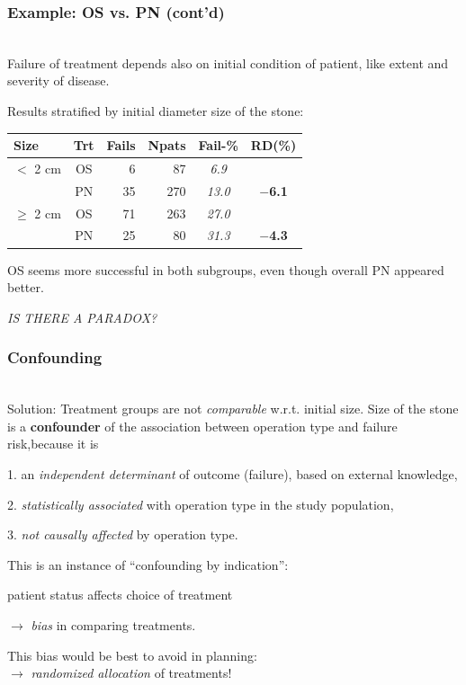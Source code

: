 \documentclass[handout,12pt]{beamer}
\begin{document}
\begin{frame}[fragile] \frametitle{Example: OS vs. PN (cont'd)}
\ \\
Failure of treatment depends also on initial condition
of patient, like extent and severity of disease.

Results stratified by initial diameter size of the stone:

\begin{center}
\begin{tabular}{lcrrcc}
\toprule
Size   &   Trt        & Fails  & Npats & Fail-\% & {\bf RD(\%)}\\
\midrule
$<$ 2 cm  &  OS                &         6        &  87        &        {\em 6.9}  & { } \\
 & PN                &        35        & 270        &        {\em 13.0} & {\bf $-$6.1} \\
\midrule
$\geq$ 2 cm  &  OS         &          71 &        263        & {\em 27.0} & { }  \\
  &  PN         &          25 &         80        & {\em 31.3} & 
  {\bf $-$4.3} \\
\bottomrule
\end{tabular}
\end{center}

OS seems more successful in both subgroups, even though overall PN appeared better.

{\it IS THERE A PARADOX?}
\end{frame} 


\begin{frame}[fragile] \frametitle{Confounding}
\ \\
Solution:
Treatment groups are not {\it comparable}
w.r.t. initial size.
Size of the stone is a {\bf confounder}
of the association between operation type
and failure risk,because it is
\bi
\item[1.] an {\it independent determinant} of outcome (failure), based on
external knowledge,
\item[2.] {\it statistically associated} with operation type in the
   study population,
\item[3.] {\it not causally affected} by operation type.
\ei

This is an instance of ``confounding by indication'':
\bi
   \item patient status
affects choice of treatment 
  \item[$\to$] {\it bias} in comparing treatments.
\ei

This bias would be best to avoid in planning: \\
$\rightarrow$
 {\it randomized allocation} of treatments!
\end{frame} 
\end{document}
